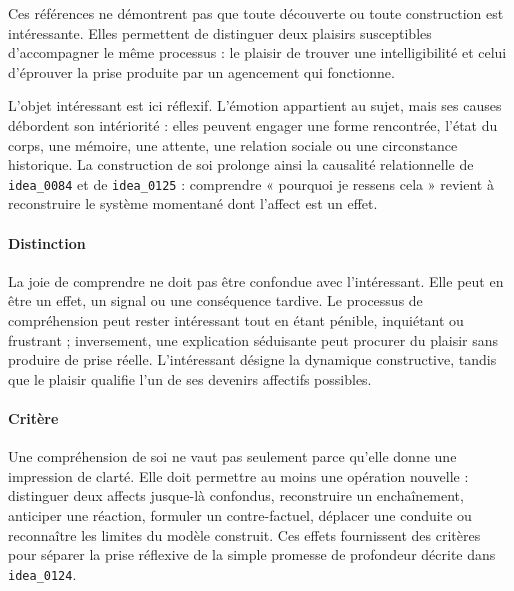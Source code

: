 \documentclass[10pt,a4paper]{article}
\begin{document}
Ces références ne démontrent pas que toute découverte ou toute construction est intéressante. Elles permettent de distinguer deux plaisirs susceptibles d'accompagner le même processus : le plaisir de trouver une intelligibilité et celui d'éprouver la prise produite par un agencement qui fonctionne.

L'objet intéressant est ici réflexif. L'émotion appartient au sujet, mais ses causes débordent son intériorité : elles peuvent engager une forme rencontrée, l'état du corps, une mémoire, une attente, une relation sociale ou une circonstance historique. La construction de soi prolonge ainsi la causalité relationnelle de \texttt{idea\_0084} et de \texttt{idea\_0125} : comprendre « pourquoi je ressens cela » revient à reconstruire le système momentané dont l'affect est un effet.

\paragraph{Distinction}
La joie de comprendre ne doit pas être confondue avec l'intéressant. Elle peut en être un effet, un signal ou une conséquence tardive. Le processus de compréhension peut rester intéressant tout en étant pénible, inquiétant ou frustrant ; inversement, une explication séduisante peut procurer du plaisir sans produire de prise réelle. L'intéressant désigne la dynamique constructive, tandis que le plaisir qualifie l'un de ses devenirs affectifs possibles.

\paragraph{Critère}
Une compréhension de soi ne vaut pas seulement parce qu'elle donne une impression de clarté. Elle doit permettre au moins une opération nouvelle : distinguer deux affects jusque-là confondus, reconstruire un enchaînement, anticiper une réaction, formuler un contre-factuel, déplacer une conduite ou reconnaître les limites du modèle construit. Ces effets fournissent des critères pour séparer la prise réflexive de la simple promesse de profondeur décrite dans \texttt{idea\_0124}.
\end{document}
